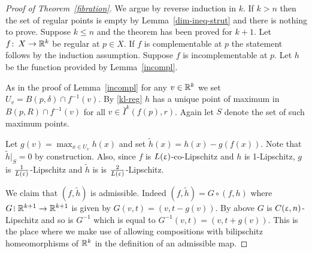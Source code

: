 \begin{proof}[Proof of Theorem~\ref{fibration}]


We argue by reverse induction in $k$.  If $k>n$ then the set of regular points is empty by Lemma~\ref{dim-ineq-strut} and there is nothing to prove. Suppose $k\le n$ and the theorem has been proved for $k+1$.
 Let $f\co X\to \R^k$ be regular at $p\in X$.
If $f$ is complementable at $p$ the statement follows by the induction assumption. Suppose $f$ is incomplementable at $p$. Let $h$ be the function provided by Lemma~\ref{incompl}. 
\begin{comment}Suppose for simplicity that $h$ is identically zero on $S$. 
Let $U= f^{-1}\left(\bar{I}^k(f(p),r) \right)\cap\{-A<h<0\}\cap B(p,R)$ and $W=f^{-1}\left(\bar{I}^k(f(p),r) \right)\cap\{-A<h\le 0\}\cap B(p,R)$

Then $U=W\backslash S$ and $(f,h)$ is regular on $U$. Therefore the  local fibration theorem holds for $(f,h)$ on $U$ by induction assumption.  

By Lemma~\ref{incompl}, $(f,h)$ is proper on $U$ and hence, 
$(f,h)\co U\to \bar{I}^k(f(p),r)\times (-A,0)$ is a  bundle map by~\cite[6.10]{Sieb}. This means that
$U$ is homeomorphic to $F\times  \bar{I}^k(f(p),r)\times (-A,0)$ respecting $(f,h)$ where $F$ is an MCS-space of $\dim=n-k-1$. By Lemma~\ref{incompl}, we can extend this homeomorphism to
a homeomorphism $W\to KF\times \bar{I}^k(f(p),r)$ which proves the induction step.

The general case when $h$ is not  constant on $S$ is handled  by constructing an auxiliary function $\tilde h$ obtained by shifting $h$ by constants on each of the fiber of $f$ to make it identically zero on $S$. 
\end{comment}


 As in the proof of Lemma~\ref{incompl}  for any $v\in\R^k$ we set $U_v=B(p,\delta)\cap f^{-1}(v)$.
 By  \eqref{kl-reg} $h$ has a unique point of maximum  in $B(p,R)\cap f^{-1}(v)$ for all $v\in \bar{I}^k(f(p),r) $.  Again let $S$ denote the set of such maximum points.
 
 
  Let $g (v)=\max_{x\in U_v}h(x)$ and set $\tilde h(x)=h(x)-g(f(x))$. Note that $\tilde h|_S=0$ by construction. Also,  since $f$ is $L(\upvarepsilon)$-co-Lipschitz and $h$ is 1-Lipschitz, $g$ is $\frac{1}{L(\upvarepsilon)}$-Lipschitz and $\tilde h$ is is $\frac{2}{L(\upvarepsilon)}$-Lipschitz.
 
 We claim that $(f,\tilde h)$ is admissible. Indeed $(f,\tilde h)=G\circ (f,h)$ where $G\?\R^{k+1}\to\R^{k+1}$ is  given by $G(v,t)=(v, t-g(v))$.
 By above $G$ is $C(\upvarepsilon,n)$-Lipschitz and so is $G^{-1}$ which is equal to  $G^{-1}(v,t)=(v, t+g(v))$.
 This is the place where we make use of allowing compositions with bilipschitz homeomorphisms of $\mathbb{R}^k$ in the definition of an admissible map.
 

\end{proof}
